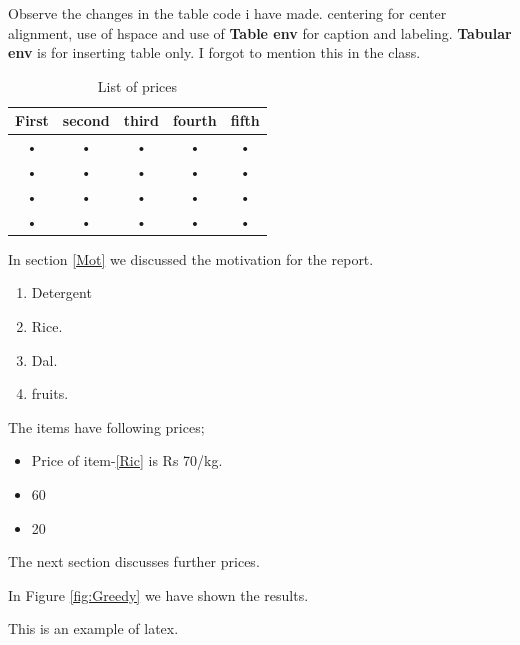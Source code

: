 \documentclass[10pt,a4paper]{report}
\begin{document}
Observe the changes in the table code i have made. centering for center alignment, use of hspace and use of \textbf{Table env} for caption and labeling. \textbf{Tabular env} is for inserting table only. I forgot to mention this in the class.
\begin{table}

\label{Tab1}
\caption{List of prices}
\centering
\hspace{2cm}

\begin{tabular}{|c|c|c|c|c|}
\hline 
First & second & third & fourth & fifth \\ 
\hline 
• & • & • & • & • \\ [0.5cm]
\hline 
• & • & • & • & • \\ 
\hline 
• & • & • & • & • \\ 
\hline 
• & • & • & • & • \\ 
\hline 
\end{tabular} 
\end{table}











In section \ref{Mot} we discussed the motivation for the report.
\begin{enumerate}
\item Detergent
\item Rice.\label{Ric}
\item Dal.
\item fruits.

\end{enumerate}
The items have following prices;
\begin{itemize}
\item Price of item-\ref{Ric} is Rs 70/kg.
\item 60
\item 20
\end{itemize}
\hspace{5cm} The next section discusses further prices.










%




In Figure \ref{fig:Greedy} we have shown the results.








This is an example of latex.
\end{document}
